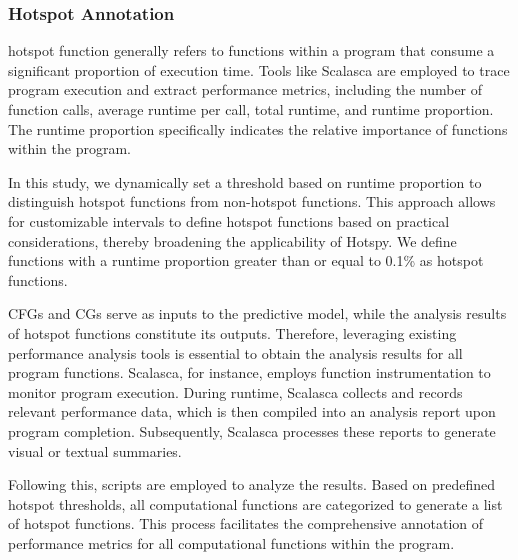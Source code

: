 \documentclass[lineno,sn-mathphys]{sn-jnl}%
\theoremstyle{thmstyleone}%
\theoremstyle{thmstyletwo}%
\theoremstyle{thmstylethree}%
\begin{document}
\subsubsection{Hotspot Annotation}
hotspot function generally refers to functions within a program that consume a significant proportion of execution time. Tools like Scalasca are employed to trace program execution and extract performance metrics, including the number of function calls, average runtime per call, total runtime, and runtime proportion. The runtime proportion specifically indicates the relative importance of functions within the program.\par
In this study, we dynamically set a threshold based on runtime proportion to distinguish hotspot functions from non-hotspot functions. This approach allows for customizable intervals to define hotspot functions based on practical considerations, thereby broadening the applicability of Hotspy. We define functions with a runtime proportion greater than or equal to 0.1\% as hotspot functions.\par
CFGs and CGs serve as inputs to the predictive model, while the analysis results of hotspot functions constitute its outputs. Therefore, leveraging existing performance analysis tools is essential to obtain the analysis results for all program functions. Scalasca, for instance, employs function instrumentation to monitor program execution. During runtime, Scalasca collects and records relevant performance data, which is then compiled into an analysis report upon program completion. Subsequently, Scalasca processes these reports to generate visual or textual summaries.\par
Following this, scripts are employed to analyze the results. Based on predefined hotspot thresholds, all computational functions are categorized to generate a list of hotspot functions. This process facilitates the comprehensive annotation of performance metrics for all computational functions within the program.
\end{document}
